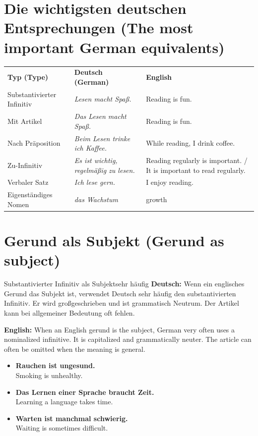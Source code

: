 \documentclass[a4paper,11pt]{article}
\newcommand{\GermanText}[1]{\textbf{Deutsch: }#1\par}
\newcommand{\EnglishText}[1]{{\small\color{SoftGray}\textbf{English: }#1\par}}
\newcommand{\ExampleItem}[2]{\item \textbf{#1}\\{\small\color{SoftGray}#2}}
\begin{document}
\section{Die wichtigsten deutschen Entsprechungen \textnormal{(The most important German equivalents)}}
\begin{longtable}{>{\raggedright\arraybackslash}p{3.0cm}|>{\raggedright\arraybackslash}p{5.5cm}|>{\raggedright\arraybackslash}p{5.5cm}}
\rowcolor{HeaderBlueDark}
\color{white}\textbf{Typ (Type)} & \color{white}\textbf{Deutsch (German)} & \color{white}\textbf{English} \\
Substantivierter Infinitiv & \textit{Lesen macht Spaß.} & Reading is fun. \\
Mit Artikel & \textit{Das Lesen macht Spaß.} & Reading is fun. \\
Nach Präposition & \textit{Beim Lesen trinke ich Kaffee.} & While reading, I drink coffee. \\
Zu-Infinitiv & \textit{Es ist wichtig, regelmäßig zu lesen.} & Reading regularly is important. / It is important to read regularly. \\
Verbaler Satz & \textit{Ich lese gern.} & I enjoy reading. \\
Eigenständiges Nomen & \textit{das Wachstum} & growth \\
\end{longtable}

\section{Gerund als Subjekt \textnormal{(Gerund as subject)}}
\begin{grammarentry}{Substantivierter Infinitiv als Subjekt}{sehr häufig}
\GermanText{Wenn ein englisches Gerund das Subjekt ist, verwendet Deutsch sehr häufig den substantivierten Infinitiv. Er wird großgeschrieben und ist grammatisch Neutrum. Der Artikel kann bei allgemeiner Bedeutung oft fehlen.}
\EnglishText{When an English gerund is the subject, German very often uses a nominalized infinitive. It is capitalized and grammatically neuter. The article can often be omitted when the meaning is general.}
\end{grammarentry}

\begin{exbox}
\begin{itemize}
\ExampleItem{Rauchen ist ungesund.}{Smoking is unhealthy.}
\ExampleItem{Das Lernen einer Sprache braucht Zeit.}{Learning a language takes time.}
\ExampleItem{Warten ist manchmal schwierig.}{Waiting is sometimes difficult.}
\end{itemize}
\end{exbox}
\end{document}
